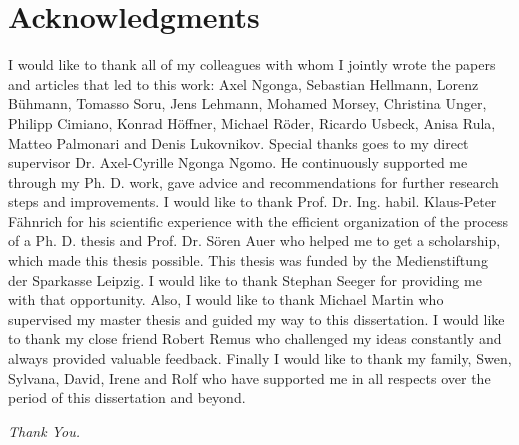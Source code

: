 



\bigskip

\begingroup
\let\clearpage\relax
\let\cleardoublepage\relax
\let\cleardoublepage\relax
\chapter*{Acknowledgments}
I would like to thank all of my colleagues with whom I jointly wrote the papers and articles that led to this work: Axel Ngonga, Sebastian Hellmann, Lorenz B\"uhmann, Tomasso Soru, Jens Lehmann, Mohamed Morsey, Christina Unger, Philipp Cimiano, Konrad H\"offner, Michael R\"oder, Ricardo Usbeck, Anisa Rula, Matteo Palmonari and Denis Lukovnikov.
Special thanks goes to my direct supervisor Dr. Axel-Cyrille Ngonga Ngomo.
He continuously supported me through my Ph. D. work, gave advice and recommendations for further research steps and improvements.
I would like to thank Prof. Dr. Ing. habil. Klaus-Peter F\"ahnrich for his scientific experience with the efficient organization of the process of a Ph. D. thesis and Prof. Dr. S\"oren Auer who helped me to get a scholarship, which made this thesis possible.   
This thesis was funded by the Medienstiftung der Sparkasse Leipzig.
I would like to thank Stephan Seeger for providing me with that opportunity. 
Also, I would like to thank Michael Martin who supervised my master thesis and guided my way to this dissertation. 
I would like to thank my close friend Robert Remus who challenged my ideas constantly and always provided valuable feedback.
Finally I would like to thank my family, Swen, Sylvana, David, Irene and Rolf who have supported me in all respects over the period of this dissertation and beyond. 
\begin{center}
\textit{Thank You.}
\end{center}



\endgroup



